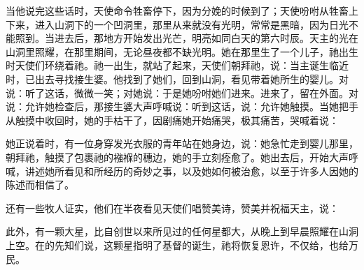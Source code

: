 当他说完这些话时，天使命令牲畜停下，因为分娩的时候到了；天使吩咐从牲畜上下来，进入山洞下的一个凹洞里，那里从来就没有光明，常常是黑暗，因为日光不能照到。当进去后，那地方开始发出光芒，明亮如同白天的第六时辰。天主的光在山洞里照耀，在那里期间，无论昼夜都不缺光明。她在那里生了一个儿子，祂出生时天使们环绕着祂。祂一出生，就站了起来，天使们朝拜祂，说：当主诞生临近时，已出去寻找接生婆。他找到了她们，回到山洞，看见带着她所生的婴儿。对说：听了这话，微微一笑；对她说：于是她吩咐她们进来。进来了，留在外面。对说：允许她检查后，那接生婆大声呼喊说：听到这话，说：允许她触摸。当她把手从触摸中收回时，她的手枯干了，因剧痛她开始痛哭，极其痛苦，哭喊着说：\par

她正说着时，有一位身穿发光衣服的青年站在她身边，说：她急忙走到婴儿那里，朝拜祂，触摸了包裹祂的襁褓的穗边，她的手立刻痊愈了。她出去后，开始大声呼喊，讲述她所看见和所经历的奇妙之事，以及她如何被治愈，以至于许多人因她的陈述而相信了。\par

还有一些牧人证实，他们在半夜看见天使们唱赞美诗，赞美并祝福天主，说：\par

此外，有一颗大星，比自创世以来所见过的任何星都大，从晚上到早晨照耀在山洞上空。在的先知们说，这颗星指明了基督的诞生，祂将恢复恩许，不仅给，也给万民。\par



